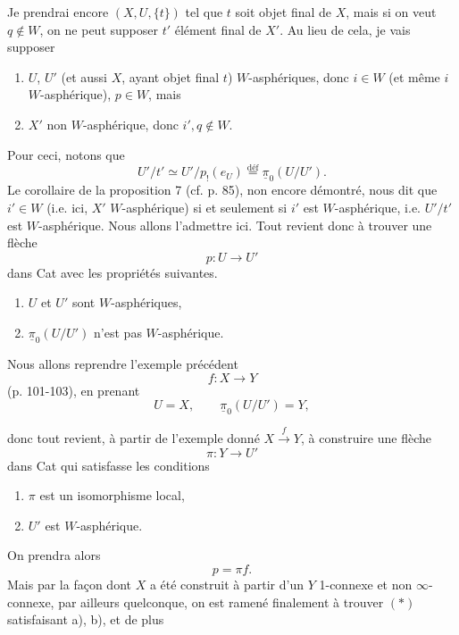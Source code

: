 \documentclass[11pt]{article}
\newcommand{\printedpage}[1]{\marginpar{\footnotesize p.~#1}}
\newcommand{\msp}[1]{\marginpar{\footnotesize [#1]}}
\begin{document}
\setcounter{footnote}{76}

\printedpage{73}

\msp{page 105}

Je prendrai encore $(X,U,\{t\})$ tel que $t$ soit objet final de $X$, mais si on veut $q\notin W$, on ne peut supposer $t'$ élément final de $X'$. Au lieu de cela, je vais supposer

\begin{enumerate}[label=\alph*)]
\item $U$, $U'$ (et aussi $X$, ayant objet final $t$) $W$-asphériques, donc $i\in W$ (et même $i$ $W$-asphérique), $p\in W$, mais
\item $X'$ non $W$-asphérique, donc $i',q\notin W$.
\end{enumerate}

Pour ceci, notons que
\[ U'/t'\simeq U'/p_!(e_U)\overset{\text{déf}}{=}\underline{\pi}_0(U/U'). \]
Le corollaire de la proposition 7 (cf. p. 85), non encore démontré, nous dit que $i'\in W$ (i.e. ici, $X'$ $W$-asphérique) si et seulement si $i'$ est $W$-asphérique, i.e. $U'/t'$ est $W$-asphérique. Nous allons l'admettre ici. Tout revient donc à trouver une flèche
\[ p:U\longrightarrow U' \]
dans Cat avec les propriétés suivantes.

\begin{enumerate}[label=\alph*)]
\item $U$ et $U'$ sont $W$-asphériques,
\item $\underline{\pi}_0(U/U')$ n'est pas $W$-asphérique.
\end{enumerate}

Nous allons reprendre l'exemple précédent
\[ f:X\longrightarrow Y \]
(p. 101-103), en prenant
\[ U=X,\qquad \underline{\pi}_0(U/U')=Y, \]

\msp{page 106}

donc tout revient, à partir de l'exemple donné $X\xrightarrow{f}Y$, à construire une flèche
\[ \pi:Y\longrightarrow U' \tag*{$(*)$} \]
dans Cat qui satisfasse les conditions

\begin{enumerate}[label=\alph*)]
\item $\pi$ est un isomorphisme local,
\item $U'$ est $W$-asphérique.
\end{enumerate}

On prendra alors
\[ p=\pi f. \]
Mais par la façon dont $X$ a été construit à partir d'un $Y$ 1-connexe et non $\infty$-connexe, par ailleurs quelconque, on est ramené finalement à trouver $(*)$ satisfaisant a), b), et de plus
\end{document}
